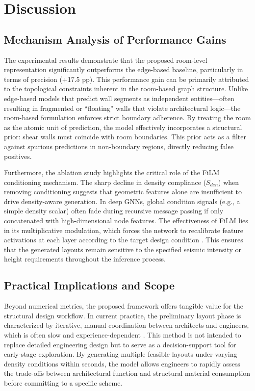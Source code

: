 \section{Discussion}
\label{sec:discussion}

\subsection{Mechanism Analysis of Performance Gains}
\label{subsec:mechanism}

The experimental results demonstrate that the proposed room-level representation significantly outperforms the edge-based baseline, particularly in terms of precision (+17.5 pp). This performance gain can be primarily attributed to the topological constraints inherent in the room-based graph structure. Unlike edge-based models that predict wall segments as independent entities---often resulting in fragmented or ``floating'' walls that violate architectural logic---the room-based formulation enforces strict boundary adherence. By treating the room as the atomic unit of prediction, the model effectively incorporates a structural prior: shear walls must coincide with room boundaries. This prior acts as a filter against spurious predictions in non-boundary regions, directly reducing false positives.

Furthermore, the ablation study highlights the critical role of the FiLM conditioning mechanism. The sharp decline in density compliance ($S_{den}$) when removing conditioning suggests that geometric features alone are insufficient to drive density-aware generation. In deep GNNs, global condition signals (e.g., a simple density scalar) often fade during recursive message passing if only concatenated with high-dimensional node features. The effectiveness of FiLM lies in its multiplicative modulation, which forces the network to recalibrate feature activations at each layer according to the target design condition \cite{perezFiLMVisualReasoning2018}. This ensures that the generated layouts remain sensitive to the specified seismic intensity or height requirements throughout the inference process.

\subsection{Practical Implications and Scope}
\label{subsec:implications}

Beyond numerical metrics, the proposed framework offers tangible value for the structural design workflow. In current practice, the preliminary layout phase is characterized by iterative, manual coordination between architects and engineers, which is often slow and experience-dependent \cite{Steiner_2016,heGenerativeAIBIMAutomatic2025}. This method is not intended to replace detailed engineering design but to serve as a decision-support tool for early-stage exploration. By generating multiple feasible layouts under varying density conditions within seconds, the model allows engineers to rapidly assess the trade-offs between architectural function and structural material consumption before committing to a specific scheme.

